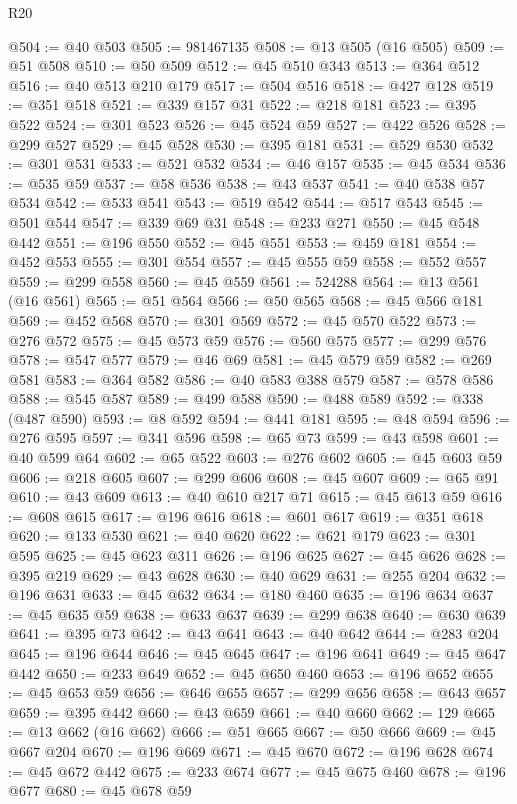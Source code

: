 \begin{lexlean}{R20}
\begin{coremodule}
@504 := @40 @503
@505 := 981467135
@508 := @13 @505 (@16 @505)
@509 := @51 @508
@510 := @50 @509
@512 := @45 @510 @343
@513 := @364 @512
@516 := @40 @513 @210 @179
@517 := @504 @516
@518 := @427 @128
@519 := @351 @518
@521 := @339 @157 @31
@522 := @218 @181
@523 := @395 @522
@524 := @301 @523
@526 := @45 @524 @59
@527 := @422 @526
@528 := @299 @527
@529 := @45 @528
@530 := @395 @181
@531 := @529 @530
@532 := @301 @531
@533 := @521 @532
@534 := @46 @157
@535 := @45 @534
@536 := @535 @59
@537 := @58 @536
@538 := @43 @537
@541 := @40 @538 @57 @534
@542 := @533 @541
@543 := @519 @542
@544 := @517 @543
@545 := @501 @544
@547 := @339 @69 @31
@548 := @233 @271
@550 := @45 @548 @442
@551 := @196 @550
@552 := @45 @551
@553 := @459 @181
@554 := @452 @553
@555 := @301 @554
@557 := @45 @555 @59
@558 := @552 @557
@559 := @299 @558
@560 := @45 @559
@561 := 524288
@564 := @13 @561 (@16 @561)
@565 := @51 @564
@566 := @50 @565
@568 := @45 @566 @181
@569 := @452 @568
@570 := @301 @569
@572 := @45 @570 @522
@573 := @276 @572
@575 := @45 @573 @59
@576 := @560 @575
@577 := @299 @576
@578 := @547 @577
@579 := @46 @69
@581 := @45 @579 @59
@582 := @269 @581
@583 := @364 @582
@586 := @40 @583 @388 @579
@587 := @578 @586
@588 := @545 @587
@589 := @499 @588
@590 := @488 @589
@592 := @338 (@487 @590)
@593 := @8 @592
@594 := @441 @181
@595 := @48 @594
@596 := @276 @595
@597 := @341 @596
@598 := @65 @73
@599 := @43 @598
@601 := @40 @599 @64
@602 := @65 @522
@603 := @276 @602
@605 := @45 @603 @59
@606 := @218 @605
@607 := @299 @606
@608 := @45 @607
@609 := @65 @91
@610 := @43 @609
@613 := @40 @610 @217 @71
@615 := @45 @613 @59
@616 := @608 @615
@617 := @196 @616
@618 := @601 @617
@619 := @351 @618
@620 := @133 @530
@621 := @40 @620
@622 := @621 @179
@623 := @301 @595
@625 := @45 @623 @311
@626 := @196 @625
@627 := @45 @626
@628 := @395 @219
@629 := @43 @628
@630 := @40 @629
@631 := @255 @204
@632 := @196 @631
@633 := @45 @632
@634 := @180 @460
@635 := @196 @634
@637 := @45 @635 @59
@638 := @633 @637
@639 := @299 @638
@640 := @630 @639
@641 := @395 @73
@642 := @43 @641
@643 := @40 @642
@644 := @283 @204
@645 := @196 @644
@646 := @45 @645
@647 := @196 @641
@649 := @45 @647 @442
@650 := @233 @649
@652 := @45 @650 @460
@653 := @196 @652
@655 := @45 @653 @59
@656 := @646 @655
@657 := @299 @656
@658 := @643 @657
@659 := @395 @442
@660 := @43 @659
@661 := @40 @660
@662 := 129
@665 := @13 @662 (@16 @662)
@666 := @51 @665
@667 := @50 @666
@669 := @45 @667 @204
@670 := @196 @669
@671 := @45 @670
@672 := @196 @628
@674 := @45 @672 @442
@675 := @233 @674
@677 := @45 @675 @460
@678 := @196 @677
@680 := @45 @678 @59

\end{coremodule}
\end{lexlean}

